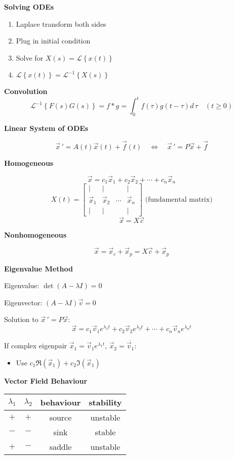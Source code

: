 \documentclass[10pt]{article}
\newcommand{\lap}[1]{\mathcal{L}\left\{#1\right\}}
\newcommand{\lapinv}[1]{\mathcal{L}^{-1}\left\{#1\right\}}
\newcommand{\conj}[1]{\overline{#1}}
\newcommand\sectionheading[1]{\begin{center}\large{\textbf{#1}}\end{center}\normalsize}
\newcommand\heading[1]{\smallskip\textbf{#1}\smallskip}
\begin{document}
\begin{multicols*}{3}
\heading{Solving ODEs}

\begin{enumerate}[noitemsep,topsep=0pt]
    \item Laplace transform both sides 
    \item Plug in initial condition 
    \item Solve for $X(s)=\lap{x(t)}$
    \item $\lap{x(t)}=\lapinv{X(s)}$
\end{enumerate}

\heading{Convolution}
\[\lapinv{F(s) G(s)}=f*g=\int_0^t f(\tau)g(t-\tau)d\,\tau \quad (t\ge 0)\]

\sectionheading{Linear System of ODEs}
\[\vec{x}\,'=A(t)\vec x(t)+\vec f(t) \quad\Leftrightarrow\quad \vec x\,'=P\vec x+\vec f\]

\heading{Homogeneous}

\[\vec x=c_1\vec x_1+c_2\vec x_2+\cdots+c_n\vec x_n\]
\[X(t)=\begin{bmatrix}
    | & | & & | \\
    \vec x_1 & \vec x_2 & \cdots & \vec x_n \\
    | & | & & | 
\end{bmatrix} \text{ (fundamental matrix)}\]
\[\vec x=X\vec c\]

\heading{Nonhomogeneous}

\[\vec x=\vec x_c+\vec x_p=X\vec c+\vec x_p\]

\heading{Eigenvalue Method}

Eigenvalue: $\det(A-\lambda I)=0$

Eigenvector: $(A-\lambda I)\vec v=0$

Solution to $\vec x\,'=P\vec x$:
\[\vec x=c_1\vec v_1e^{\lambda_1 t}+c_2\vec v_2e^{\lambda_2 t}+\cdots+c_n\vec v_ne^{\lambda_n t}\]

If complex eigenpair $\vec x_1=\vec v_1e^{\lambda_1 t}$, $\vec x_2=\conj{\vec v_1}$: 
\begin{itemize}[noitemsep,topsep=0pt]
    \item Use $c_1 \Re(\vec x_1)+c_2 \Im(\vec x_1)$ 
\end{itemize}

\heading{Vector Field Behaviour}

\begin{tabular}{|c|c|c|c|}
    \hline
    $\lambda_1$ & $\lambda_2$ & behaviour & stability \\
    \hline
    $+$ & $+$ & source & unstable \\
    $-$ & $-$ & sink & stable \\
    $+$ & $-$ & saddle & unstable\\
    \hline
\end{tabular}


\end{multicols*}
\end{document}
